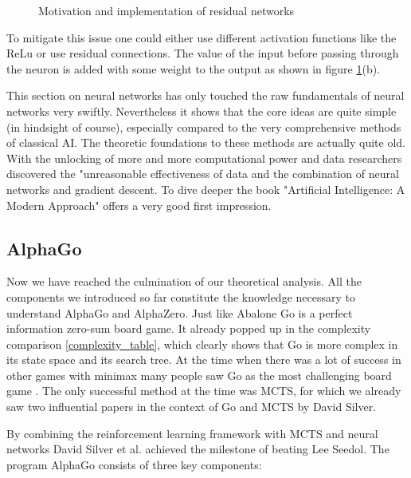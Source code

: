 \begin{figure}[!h]
    \centering
    \caption{Motivation and implementation of residual networks}
    \label{residual_network}
\end{figure}

To mitigate this issue one could either use different activation functions like the ReLu or use residual connections. The value of the input before passing through the neuron is added with some weight to the output as shown in figure \ref{residual_network}(b).

This section on neural networks has only touched the raw fundamentals of neural networks very swiftly. Nevertheless it shows that the core ideas are quite simple (in hindsight of course), especially compared to the very comprehensive methods of classical AI. The theoretic foundations to these methods are actually quite old. With the unlocking of more and more computational power and data researchers discovered the "unreasonable effectiveness of data \cite{halevy_unreasonable_2009} and the combination of neural networks and gradient descent. To dive deeper the book "Artificial Intelligence: A Modern Approach" \cite{russell_artificial_2021} offers a very good first impression.

\subsection{AlphaGo}
Now we have reached the culmination of our theoretical analysis. All the components we introduced so far constitute the knowledge necessary to understand AlphaGo and AlphaZero. Just like Abalone Go is a perfect information zero-sum board game. It already popped up in the complexity comparison \ref{complexity_table}, which clearly shows that Go is more complex in its state space and its search tree. At the time when there was a lot of success in other games with minimax many people saw Go as the most challenging board game \cite{muller_computer_2002}. The only successful method at the time was MCTS, for which we already saw two influential papers in the context of Go and MCTS by David Silver.

By combining the reinforcement learning framework with MCTS and neural networks David Silver et al. achieved the milestone of beating Lee Seedol. The program AlphaGo consists of three key components:

